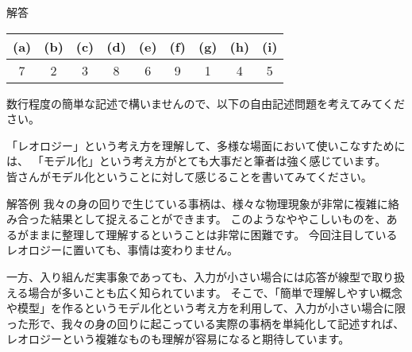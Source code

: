 \documentclass[uplatex,dvipdfmx,a4paper,11pt]{jsarticle}
\begin{document}
\begin{itembox}[l]{解答}
    \begin{center} 
      \begin{tabular}{|c|c|c|c|c|c|c|c|c|} \hline
        (a) & (b) & (c) & (d) & (e) & (f) & (g) & (h) & (i)\\ \hline
        7 & 2 & 3 & 8 & 6 & 9 & 1 & 4 & 5 \\ \hline		
      \end{tabular}
    \end{center}
\end{itembox}

数行程度の簡単な記述で構いませんので、以下の自由記述問題を考えてみてください。
\begin{qlist}
\qitem 「レオロジー」という考え方を理解して、多様な場面において使いこなすためには、
「モデル化」という考え方がとても大事だと筆者は強く感じています。\\
皆さんがモデル化ということに対して感じることを書いてみてください。
\end{qlist}

\begin{itembox}[l]{解答例}
    我々の身の回りで生じている事柄は、様々な物理現象が非常に複雑に絡み合った結果として捉えることができます。
    このようなややこしいものを、あるがままに整理して理解するということは非常に困難です。
    今回注目しているレオロジーに置いても、事情は変わりません。

    一方、入り組んだ実事象であっても、入力が小さい場合には応答が線型で取り扱える場合が多いことも広く知られています。
    そこで、「簡単で理解しやすい概念や模型」を作るというモデル化という考え方を利用して、入力が小さい場合に限った形で、我々の身の回りに起こっている実際の事柄を単純化して記述すれば、レオロジーという複雑なものも理解が容易になると期待しています。
    \end{itembox}
\end{document}
